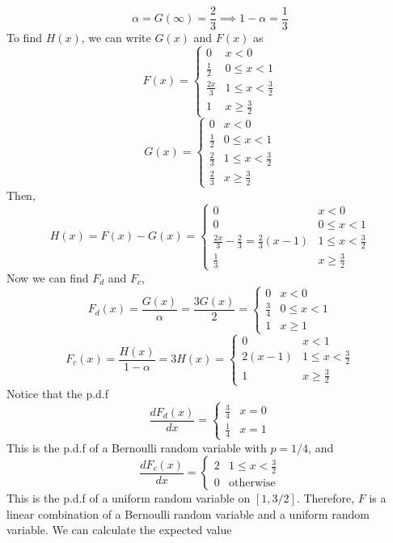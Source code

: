 \documentclass[openany]{report}
\begin{document}
\[\alpha = G(\infty) = \frac{2}{3} \implies 1 - \alpha = \frac{1}{3}\]
To find $H(x)$, we can write $G(x)$ and $F(x)$ as 
\[F(x) = \begin{cases}
    0 & x < 0\\
    \frac{1}{2} & 0 \leq x < 1\\
    \frac{2x}{3} & 1 \leq x < \frac{3}{2}\\
    1 & x \geq \frac{3}{2}
\end{cases}\]
\[G(x) = \begin{cases}
    0 & x < 0\\
    \frac{1}{2} & 0 \leq x < 1\\
    \frac{2}{3} & 1 \leq x < \frac{3}{2}\\
    \frac{2}{3} & x \geq \frac{3}{2}
\end{cases}\]
Then, 
\[H(x) = F(x) - G(x) = \begin{cases}
    0 & x < 0\\
    0 & 0 \leq x < 1\\
    \frac{2x}{3} - \frac{2}{3} = \frac{2}{3}(x-1) & 1 \leq x < \frac{3}{2}\\
    \frac{1}{3} & x \geq \frac{3}{2}
\end{cases}\]
Now we can find $F_d$ and $F_c$, 
\[F_d(x) = \frac{G(x)}{\alpha} = \frac{3G(x)}{2} = \begin{cases}
    0 & x < 0\\
    \frac{3}{4} & 0 \leq x < 1\\
    1 & x \geq 1
\end{cases}\]
\[F_c(x) = \frac{H(x)}{1 - \alpha} =  3H(x) = \begin{cases}
    0 & x <1\\
    2(x-1) & 1 \leq x < \frac{3}{2}\\
    1 & x \geq \frac{3}{2}
\end{cases}\]
Notice that the p.d.f
\[\frac{dF_d(x)}{dx} = \begin{cases}
    \frac{3}{4} & x = 0\\
    \frac{1}{4} & x = 1
\end{cases}
\]
This is the p.d.f of a Bernoulli random variable with $p = 1/4$, and 
\[\frac{dF_c(x)}{dx} = \begin{cases}
    2 & 1 \leq x < \frac{3}{2}\\
    0 & \text{otherwise}
\end{cases}\]
This is the p.d.f of a uniform random variable on $[1,3/2]$. Therefore, $F$ is a linear combination of a Bernoulli random variable and a uniform random variable. We can calculate the expected value 
\end{document}
